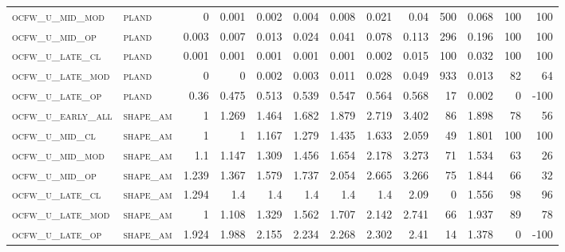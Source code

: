\begin{landscape}
\begin{center}
\begin{footnotesize}
\begin{longtable}{llrrrrrrrr|rrr}
\textsc{ocfw\_u\_mid\_mod  } & \textsc{pland     }   & 0        & 0.001    & 0.002    & 0.004    & 0.008    & 0.021    & 0.04      & 500    & 0.068         & 100           & 100             \\
\textsc{ocfw\_u\_mid\_op   } & \textsc{pland     }   & 0.003    & 0.007    & 0.013    & 0.024    & 0.041    & 0.078    & 0.113     & 296    & 0.196         & 100           & 100             \\
\textsc{ocfw\_u\_late\_cl  } & \textsc{pland     }   & 0.001    & 0.001    & 0.001    & 0.001    & 0.001    & 0.002    & 0.015     & 100    & 0.032         & 100           & 100             \\
\textsc{ocfw\_u\_late\_mod } & \textsc{pland     }   & 0        & 0        & 0.002    & 0.003    & 0.011    & 0.028    & 0.049     & 933    & 0.013         & 82            & 64              \\
\textsc{ocfw\_u\_late\_op  } & \textsc{pland     }   & 0.36     & 0.475    & 0.513    & 0.539    & 0.547    & 0.564    & 0.568     & 17     & 0.002         & 0             & -100            \\
\textsc{ocfw\_u\_early\_all} & \textsc{shape\_am }   & 1        & 1.269    & 1.464    & 1.682    & 1.879    & 2.719    & 3.402     & 86     & 1.898         & 78            & 56              \\
\textsc{ocfw\_u\_mid\_cl   } & \textsc{shape\_am }   & 1        & 1        & 1.167    & 1.279    & 1.435    & 1.633    & 2.059     & 49     & 1.801         & 100           & 100             \\
\textsc{ocfw\_u\_mid\_mod  } & \textsc{shape\_am }   & 1.1      & 1.147    & 1.309    & 1.456    & 1.654    & 2.178    & 3.273     & 71     & 1.534         & 63            & 26              \\
\textsc{ocfw\_u\_mid\_op   } & \textsc{shape\_am }   & 1.239    & 1.367    & 1.579    & 1.737    & 2.054    & 2.665    & 3.266     & 75     & 1.844         & 66            & 32              \\
\textsc{ocfw\_u\_late\_cl  } & \textsc{shape\_am }   & 1.294    & 1.4      & 1.4      & 1.4      & 1.4      & 1.4      & 2.09      & 0      & 1.556         & 98            & 96              \\
\textsc{ocfw\_u\_late\_mod } & \textsc{shape\_am }   & 1        & 1.108    & 1.329    & 1.562    & 1.707    & 2.142    & 2.741     & 66     & 1.937         & 89            & 78              \\
\textsc{ocfw\_u\_late\_op  } & \textsc{shape\_am }   & 1.924    & 1.988    & 2.155    & 2.234    & 2.268    & 2.302    & 2.41      & 14     & 1.378         & 0             & -100            \\

\end{longtable}
\end{footnotesize}
\end{center}
\end{landscape}
